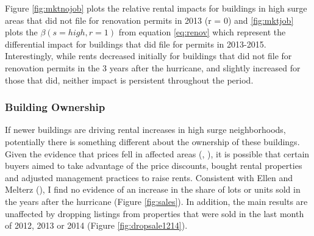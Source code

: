 \documentclass[12pt]{article}
\begin{document}
{{{{{{{{Figure \ref{fig:mktnojob} plots the relative rental impacts for buildings in high surge areas that did not file for renovation permits in 2013 (r = 0) and \ref{fig:mktjob} plots the $\beta (s= high,r = 1)$ from equation \ref{eq:renov} which represent the differential impact for buildings that did file for permits in 2013-2015. Interestingly, while rents decreased initially for buildings that did not file for renovation permits in the 3 years after the hurricane, and slightly increased for those that did, neither impact is persistent throughout the period. 





\subsubsection{Building Ownership}
If newer buildings are driving rental increases in high surge neighborhoods, potentially there is something different about the ownership of these buildings. Given the evidence that prices fell in affected areas (\cite{ellen_heterogeneity_2022}, \cite{ortega_rising_2018}), it is possible that certain buyers aimed to take advantage of the price discounts, bought rental properties and adjusted management practices to raise rents. Consistent with Ellen and Melterz (\citeyear{ellen_heterogeneity_2022}), I find no evidence of an increase in the share of lots or units sold in the years after the hurricane (Figure \ref{fig:sales}).  In addition, the main results are unaffected by dropping listings from properties that were sold in the last month of 2012, 2013 or 2014 (Figure \ref{fig:dropsale1214}).  

}}}}}}}}
\end{document}
